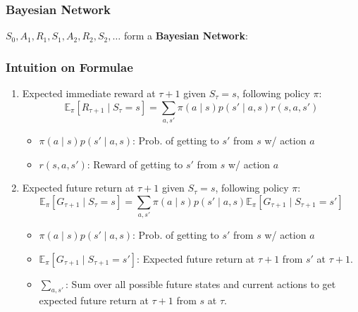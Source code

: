 \subsubsection{Bayesian Network}
\begin{notes}
    $S_0,A_1,R_1,S_1,A_2,R_2,S_2,\ldots$ form a \textbf{Bayesian Network}:
\end{notes}

\subsubsection{Intuition on Formulae}
\begin{notes}
    \begin{enumerate}
        \item Expected immediate reward at $\tau + 1$ given $S_\tau = s$, following policy $\pi$:
        \begin{equation*}
            \mathbb{E}_{\pi}[R_{\tau+1} \mid S_{\tau} = s] = \sum_{a, s'} \pi(a \mid s) p(s' \mid a, s) r(s, a, s')
        \end{equation*}
        \begin{itemize}
            \item $\pi(a \mid s) p(s' \mid a, s)$: Prob. of getting to $s'$ from $s$ w/ action $a$
            \item $r(s, a, s')$: Reward of getting to $s'$ from $s$ w/ action $a$
        \end{itemize}
        \item Expected future return at $\tau + 1$ given $S_\tau = s$, following policy $\pi$:
        \begin{equation*}
            \mathbb{E}_{\pi}[G_{\tau+1} \mid S_{\tau} = s] = \sum_{a, s'} \pi(a \mid s) p(s' \mid a, s) \mathbb{E}_{\pi}[G_{\tau+1} \mid S_{\tau+1} = s']
        \end{equation*}
        \begin{itemize}
            \item $\pi(a \mid s) p(s' \mid a, s)$: Prob. of getting to $s'$ from $s$ w/ action $a$
            \item $\mathbb{E}_{\pi}[G_{\tau+1} \mid S_{\tau+1} = s']$: Expected future return at $\tau + 1$ from $s'$ at $\tau + 1$.
            \item $\sum_{a, s'}$: Sum over all possible future states and current actions to get expected future return at $\tau + 1$ from $s$ at $\tau$.
        \end{itemize}
    \end{enumerate}
\end{notes}
\newpage

